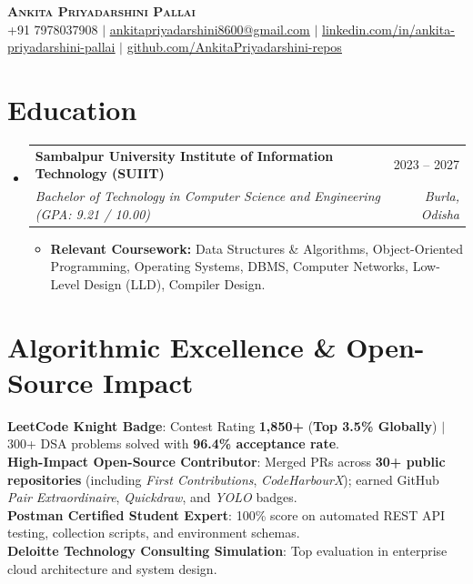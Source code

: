 \documentclass[letterpaper,10pt]{article}
\makeatletter
\newcommand{\resumeItem}[1]{
  \item\small{
    {#1 \vspace{-2pt}}
  }
}
\newcommand{\resumeSubheading}[4]{
  \vspace{-1pt}\item
    \begin{tabular*}{\textwidth}[t]{l@{\extracolsep{\fill}}r}
      \textbf{#1} & #2 \\
      \textit{\small#3} & \textit{\small #4} \\
    \end{tabular*}\vspace{-5pt}
}
\newcommand{\resumeItemListStart}{\begin{itemize}[leftmargin=15pt, label={$\bullet$}]}
\newcommand{\resumeItemListEnd}{\end{itemize}\vspace{-5pt}}
\makeatother
\begin{document}
\begin{center}
    \textbf{\Huge \scshape Ankita Priyadarshini Pallai} \\ \vspace{4pt}
    \small +91 7978037908 $|$ \href{mailto:ankitapriyadarshini8600@gmail.com}{\underline{ankitapriyadarshini8600@gmail.com}} $|$ 
    \href{https://linkedin.com/in/ankita-priyadarshini-pallai}{\underline{linkedin.com/in/ankita-priyadarshini-pallai}} $|$
    \href{https://github.com/AnkitaPriyadarshini-repos}{\underline{github.com/AnkitaPriyadarshini-repos}}
\end{center}


\section{Education}
  \begin{itemize}[leftmargin=0.15in, label={}]
    \resumeSubheading
      {Sambalpur University Institute of Information Technology (SUIIT)}{2023 -- 2027}
      {Bachelor of Technology in Computer Science and Engineering (GPA: 9.21 / 10.00)}{Burla, Odisha}
      \resumeItemListStart
        \resumeItem{\textbf{Relevant Coursework:} Data Structures \& Algorithms, Object-Oriented Programming, Operating Systems, DBMS, Computer Networks, Low-Level Design (LLD), Compiler Design.}
      \resumeItemListEnd
  \end{itemize}


\section{Algorithmic Excellence \& Open-Source Impact}
 \begin{itemize}[leftmargin=0.15in, label={}]
    \small{\item{
     \textbf{LeetCode Knight Badge}: Contest Rating \textbf{1,850+} (\textbf{Top 3.5\% Globally}) $|$ 300+ DSA problems solved with \textbf{96.4\% acceptance rate}. \\
     \textbf{High-Impact Open-Source Contributor}: Merged PRs across \textbf{30+ public repositories} (including \emph{First Contributions}, \emph{CodeHarbourX}); earned GitHub \emph{Pair Extraordinaire}, \emph{Quickdraw}, and \emph{YOLO} badges. \\
     \textbf{Postman Certified Student Expert}: 100\% score on automated REST API testing, collection scripts, and environment schemas. \\
     \textbf{Deloitte Technology Consulting Simulation}: Top evaluation in enterprise cloud architecture and system design.
    }}
 \end{itemize}
\end{document}
